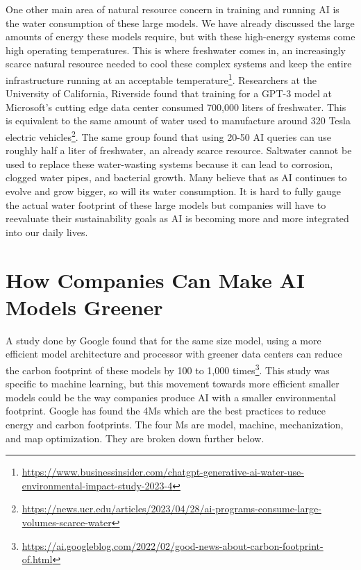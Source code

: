 \documentclass[
]{book}
\begin{document}
One other main area of natural resource concern in training and running AI is the water consumption of these large models. We have already discussed the large amounts of energy these models require, but with these high-energy systems come high operating temperatures. This is where freshwater comes in, an increasingly scarce natural resource needed to cool these complex systems and keep the entire infrastructure running at an acceptable temperature\footnote{\url{https://www.businessinsider.com/chatgpt-generative-ai-water-use-environmental-impact-study-2023-4}}. Researchers at the University of California, Riverside found that training for a GPT-3 model at Microsoft's cutting edge data center consumed 700,000 liters of freshwater. This is equivalent to the same amount of water used to manufacture around 320 Tesla electric vehicles\footnote{\url{https://news.ucr.edu/articles/2023/04/28/ai-programs-consume-large-volumes-scarce-water}}. The same group found that using 20-50 AI queries can use roughly half a liter of freshwater, an already scarce resource. Saltwater cannot be used to replace these water-wasting systems because it can lead to corrosion, clogged water pipes, and bacterial growth. Many believe that as AI continues to evolve and grow bigger, so will its water consumption. It is hard to fully gauge the actual water footprint of these large models but companies will have to reevaluate their sustainability goals as AI is becoming more and more integrated into our daily lives.

\hypertarget{how-companies-can-make-ai-models-greener}{%
\section{How Companies Can Make AI Models Greener}\label{how-companies-can-make-ai-models-greener}}

A study done by Google found that for the same size model, using a more efficient model architecture and processor with greener data centers can reduce the carbon footprint of these models by 100 to 1,000 times\footnote{\url{https://ai.googleblog.com/2022/02/good-news-about-carbon-footprint-of.html}}. This study was specific to machine learning, but this movement towards more efficient smaller models could be the way companies produce AI with a smaller environmental footprint. Google has found the 4Ms which are the best practices to reduce energy and carbon footprints. The four Ms are model, machine, mechanization, and map optimization. They are broken down further below.
\end{document}
